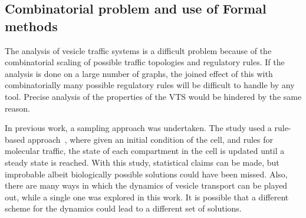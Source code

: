 %

\label{subsec:graphmodel}
%
\subsection{Combinatorial problem and use of Formal methods}
\noindent The analysis of vesicle traffic systems is a difficult problem
because of the combinatorial scaling of possible traffic topologies and regulatory rules. 
%
%
If the analysis is done on a large number of graphs, the joined effect of this with combinatorially many possible regulatory rules will be difficult to handle by any tool.
%
Precise analysis of the properties of the VTS would be hindered by the same reason. 

In previous work, a sampling approach was undertaken. 
%
The study used a rule-based approach~\cite{mani2016stacking}, where given an initial condition of the cell, and rules for molecular traffic, the state of each compartment in the cell is updated until a steady state is reached. 
%
With this study, statistical claims can be made, but improbable albeit biologically possible solutions could have been missed.
%
Also, there are many ways in which the dynamics of vesicle transport can be played out, while a single one was explored in this work. 
%
It is possible that a different scheme for the dynamics could lead to a different set of solutions.

%
%
%
%
%
%
%
%

